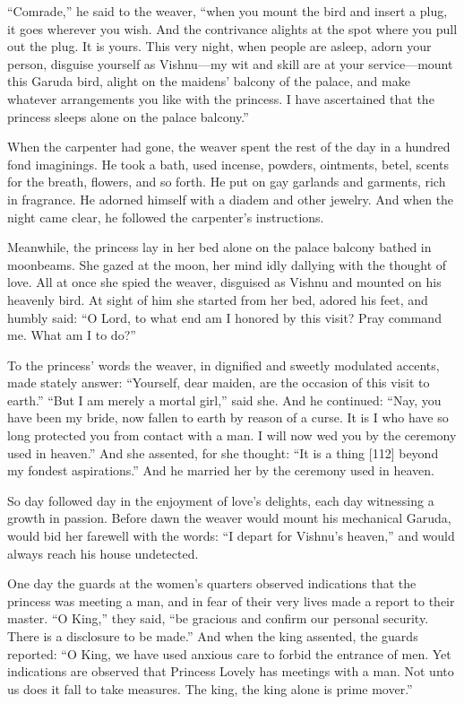 \documentclass[article, twoside, 14pt]{memoir}
\begin{document}
``Comrade,'' he said to the weaver,
``when you mount the bird and insert a plug, it goes wherever you wish. And the contrivance alights at the spot where you pull out the plug. It is yours. This very night, when people are asleep, adorn your person, disguise yourself as Vishnu---my wit and skill are at your service---mount this Garuda bird, alight on the maidens' balcony of the palace, and make whatever arrangements you like with the princess. I have ascertained that the princess sleeps alone on the palace balcony.''

When the carpenter had gone, the weaver spent the rest of the day
in a hundred fond imaginings. He took a bath, used incense,
powders, ointments, betel, scents for the breath, flowers, and so
forth. He put on gay garlands and garments, rich in fragrance. He
adorned himself with a diadem and other jewelry. And when the night
came clear, he followed the carpenter's instructions.

Meanwhile, the princess lay in her bed alone on the palace balcony
bathed in moonbeams. She gazed at the moon, her mind idly dallying
with the thought of love. All at once she spied the weaver,
disguised as Vishnu and mounted on his heavenly bird. At sight of
him she started from her bed, adored his feet, and humbly said:
``O Lord, to what end am I honored by this visit? Pray command me. What am I to do?''

To the princess' words the weaver, in dignified and sweetly
modulated accents, made stately answer:
``Yourself, dear maiden, are the occasion of this visit to earth.''
``But I am merely a mortal girl,'' said she. And he continued:
``Nay, you have been my bride, now fallen to earth by reason of a curse. It is I who have so long protected you from contact with a man. I will now wed you by the ceremony used in heaven.''
And she assented, for she thought:
``It is a thing [112] beyond my fondest aspirations.'' And he
married her by the ceremony used in heaven.

So day followed day in the enjoyment of love's delights, each day
witnessing a growth in passion. Before dawn the weaver would mount
his mechanical Garuda, would bid her farewell with the words:
``I depart for Vishnu's heaven,'' and would always reach his house
undetected.

One day the guards at the women's quarters observed indications
that the princess was meeting a man, and in fear of their very
lives made a report to their master. ``O King,'' they said,
``be gracious and confirm our personal security. There is a disclosure to be made.''
And when the king assented, the guards reported:
``O King, we have used anxious care to forbid the entrance of men. Yet indications are observed that Princess Lovely has meetings with a man. Not unto us does it fall to take measures. The king, the king alone is prime mover.''
\end{document}
